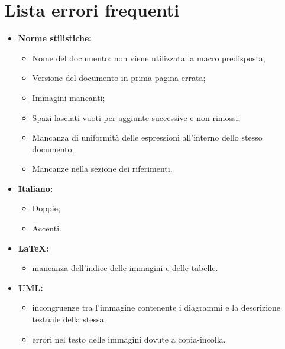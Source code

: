 \documentclass[a4paper]{article}
\begin{document}
			\section{Lista errori frequenti}
			\begin{itemize}
					\item \textbf{Norme stilistiche:}
					\begin{itemize}
						\item Nome del documento: non viene utilizzata la macro predisposta;
						\item Versione del documento in prima pagina errata;
						\item Immagini mancanti;
						\item Spazi lasciati vuoti per aggiunte successive e non rimossi;
						\item Mancanza di uniformità delle espressioni all'interno dello stesso documento;
						\item Mancanze nella sezione dei riferimenti.
					\end{itemize}
					\item \textbf{Italiano:}
					\begin{itemize}
						\item Doppie;
						\item Accenti.
					\end{itemize}
					\item \textbf{\LaTeX :}
					\begin{itemize}
						\item mancanza dell'indice delle immagini e delle tabelle.
					\end{itemize}
					\item \textbf{UML:}
					\begin{itemize}
						\item incongruenze tra l'immagine contenente i diagrammi e la descrizione testuale della stessa;
						\item errori nel testo delle immagini dovute a copia-incolla.
					\end{itemize}
				\end{itemize}
				
\cleardoublepage
	\listoffigures
	
	\cleardoublepage
	\listoftables	
\end{document}
